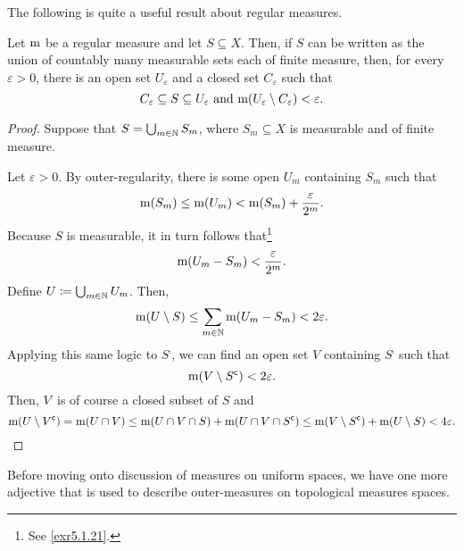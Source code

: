 The following is quite a useful result about regular measures.
\begin{prp}\label{prp5.1.39}
Let $\mathrm{m}$ be a regular measure and let $S\subseteq X$.  Then, if $S$ can be written as the union of countably many measurable sets each of finite measure, then, for every $\varepsilon >0$, there is an open set $U_{\varepsilon}$ and a closed set $C_{\varepsilon}$ such that
\begin{equation}
C_{\varepsilon}\subseteq S\subseteq U_{\varepsilon}\text{ and }\mathrm{m} (U_{\varepsilon}\setminus C_{\varepsilon})<\varepsilon .
\end{equation}
\begin{proof}
Suppose that $S=\bigcup _{m\in \mathbb{N}}S_m$, where $S_m\subseteq X$ is measurable and of finite measure.

Let $\varepsilon >0$.  By outer-regularity, there is some open $U_m$ containing $S_m$ such that
\begin{equation}
\mathrm{m} (S_m)\leq \mathrm{m} (U_m)<\mathrm{m} (S_m)+\frac{\varepsilon}{2^m}.
\end{equation}
Because $S$ is measurable, it in turn follows that\footnote{See \cref{exr5.1.21}.}
\begin{equation}
\mathrm{m} (U_m-S_m)<\frac{\varepsilon}{2^m}.
\end{equation}
Define $U\coloneqq \bigcup _{m\in \mathbb{N}}U_m$.  Then,
\begin{equation}
\mathrm{m} (U\setminus S)\leq \sum _{m\in \mathbb{N}}\mathrm{m} (U_m-S_m)<2\varepsilon .
\end{equation}
Applying this same logic to $S^{\comp}$, we can find an open set $V$ containing $S^{\comp}$ such that
\begin{equation}
\mathrm{m} (V\setminus S^{\mathsf{c} })<2\varepsilon .
\end{equation}
Then, $V^{\comp}$ is of course a closed subset of $S$ and
\begin{equation}
\mathrm{m} (U\setminus V^{\mathsf{c}})=\mathrm{m} (U\cap V)\leq \mathrm{m} (U\cap V\cap S)+\mathrm{m} (U\cap V\cap S^{\mathsf{c}})\leq \mathrm{m} (V\setminus S^{\mathsf{c}})+\mathrm{m} (U\setminus S)<4\varepsilon .
\end{equation}
\end{proof}
\end{prp}
Before moving onto discussion of measures on uniform spaces, we have one more adjective that is used to describe outer-measures on topological measures spaces.
